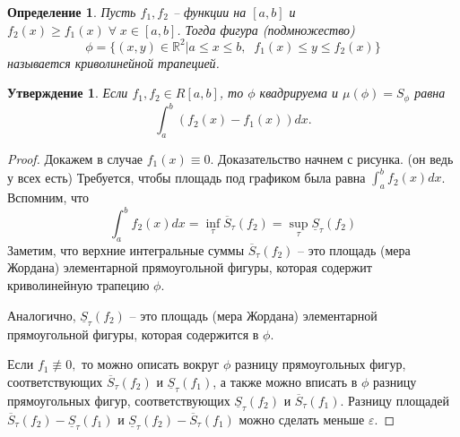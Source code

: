 \documentclass{article}
\theoremstyle{plain}
\newtheorem{claim}{Утверждение}
\newtheorem{definition}{Определение}
\theoremstyle{definition}
\theoremstyle{remark}
\begin{document}
\begin{definition}
Пусть $f_1, f_2$ -- функции на $[a,b]$ и $f_2(x) \geq f_1(x) \;\forall\; x\in [a, b]$. Тогда фигура (подмножество)
$$\phi = \{(x, y) \in \mathbb{R}^2 | a\leq x\leq b, \;\; f_1(x)\leq y \leq f_2(x) \}$$ называется криволинейной трапецией.
\end{definition}

\begin{claim}
Если $f_1, f_2 \in R[a, b]$, то $\phi$ квадрируема и $\mu(\phi) = S_{\phi}$ равна 
$$\int_a^b (f_2(x) - f_1(x))dx.$$


\end{claim}

\begin{proof}
Докажем в случае $f_1(x) \equiv 0.$ Доказательство начнем с рисунка. (он ведь у всех есть) Требуется, чтобы площадь под графиком была равна $\int_a^b f_2(x)dx$. Вспомним, что 
$$\int_a^b f_2(x)dx = \inf_{\tau}\overline{S}_{\tau}(f_2) = \sup_{\tau}\underline{S}_{\tau}(f_2)$$
Заметим, что верхние интегральные суммы $\overline{S}_{\tau}(f_2)$ -- это площадь (мера Жордана) элементарной прямоугольной фигуры, которая содержит криволинейную трапецию $\phi$.

Аналогично, $\underline{S}_{\tau}(f_2)$ -- это площадь (мера Жордана) элементарной прямоугольной фигуры, которая содержится в $\phi$. 

Если $f_1 \not\equiv 0,$ то можно описать вокруг $\phi$ разницу прямоугольных фигур, соответствующих $\overline{S}_{\tau}(f_2)$ и $\underline{S}_{\tau}(f_1)$, а также можно вписать в $\phi$ разницу прямоугольных фигур, соответствующих $\underline{S}_{\tau}(f_2)$ и $\overline{S}_{\tau}(f_1)$.
Разницу площадей
$\overline{S}_{\tau}(f_2) - \underline{S}_{\tau}(f_1)$ и  $\underline{S}_{\tau}(f_2) - \overline{S}_{\tau}(f_1)$ можно сделать меньше $\varepsilon$. %

\end{proof}
\end{document}

